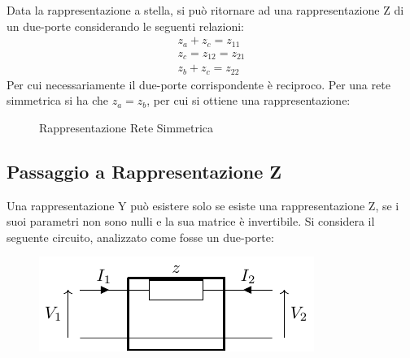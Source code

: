\documentclass{article}
\numberwithin{equation}{subsection}
\begin{document}
Data la rappresentazione a stella, si può ritornare ad una rappresentazione Z di un due-porte considerando le seguenti relazioni:
\begin{gather*}
    z_a+z_c=z_{11}\\
    z_c=z_{12}=z_{21}\\
    z_b+z_c=z_{22}
\end{gather*}
Per cui necessariamente il due-porte corrispondente è reciproco. Per una rete simmetrica si ha che $z_a=z_b$, per cui si ottiene una rappresentazione:
\begin{figure}[H]%
    \centering
    \qquad
    \caption{Rappresentazione Rete Simmetrica}%
    \label{fig:rappresentazione-rete-simmetrica}
\end{figure}

\subsection{Passaggio a Rappresentazione Z}

Una rappresentazione Y può esistere solo se esiste una rappresentazione Z, se i suoi parametri non sono nulli e la sua matrice è invertibile. 
Si considera il seguente circuito, analizzato come fosse un due-porte:
\begin{figure}[H]%
    \centering
    \includegraphics{singola-impedenza-due-porte.pdf}%
    \label{fig:singola-impedenza-due-porte}
\end{figure}
\end{document}
